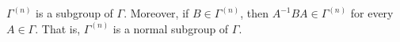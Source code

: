$\Gamma^{(n)}$ is a subgroup of $\Gamma$. Moreover, if $B \in \Gamma^{(n)}$, then $A^{-1}BA \in \Gamma^{(n)}$ for every $A \in \Gamma$. That is, $\Gamma^{(n)}$ is a normal subgroup of $\Gamma$.
